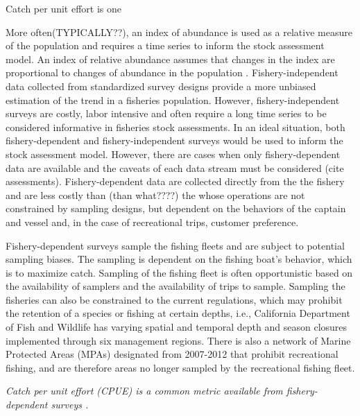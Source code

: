 \documentclass[
  12pt,
  authoryear,
  preprint,
  3p]{elsarticle}
\begin{document}
Catch per unit effort is one

More often(TYPICALLY??), an index of abundance is used as a relative
measure of the population and requires a time series to inform the stock
assessment model. An index of relative abundance assumes that changes in
the index are proportional to changes of abundance in the population
\citep{Harley:2001:CUE}. Fishery-independent data collected from
standardized survey designs provide a more unbiased estimation of the
trend in a fisheries population. However, fishery-independent surveys
are costly, labor intensive and often require a long time series to be
considered informative in fisheries stock assessments. In an ideal
situation, both fishery-dependent and fishery-independent surveys would
be used to inform the stock assessment model. However, there are cases
when only fishery-dependent data are available and the caveats of each
data stream must be considered (cite assessments). Fishery-dependent
data are collected directly from the the fishery and are less costly
than (than what????) the whose operations are not constrained by
sampling designs, but dependent on the behaviors of the captain and
vessel and, in the case of recreational trips, customer preference.

Fishery-dependent surveys sample the fishing fleets and are subject to
potential sampling biases. The sampling is dependent on the fishing
boat's behavior, which is to maximize catch. Sampling of the fishing
fleet is often opportunistic based on the availability of samplers and
the availability of trips to sample. Sampling the fisheries can also be
constrained to the current regulations, which may prohibit the retention
of a species or fishing at certain depths, i.e., California Department
of Fish and Wildlife has varying spatial and temporal depth and season
closures implemented through six management regions. There is also a
network of Marine Protected Areas (MPAs) designated from 2007-2012 that
prohibit recreational fishing, and are therefore areas no longer sampled
by the recreational fishing fleet.

\emph{Catch per unit effort (CPUE) is a common metric available from
fishery-dependent surveys \citep{Maunder:2004:SCE}.}
\end{document}
